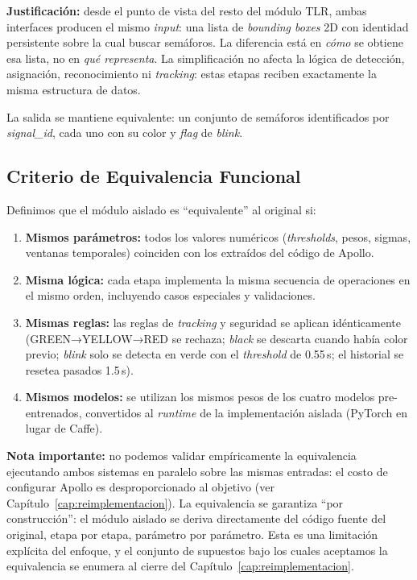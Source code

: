 \textbf{Justificación:} desde el punto de vista del resto del módulo TLR, ambas interfaces producen el mismo \textit{input}: una lista de \textit{bounding boxes} 2D con identidad persistente sobre la cual buscar semáforos. La diferencia está en \textit{cómo} se obtiene esa lista, no en \textit{qué representa}. La simplificación no afecta la lógica de detección, asignación, reconocimiento ni \textit{tracking}: estas etapas reciben exactamente la misma estructura de datos.

La salida se mantiene equivalente: un conjunto de semáforos identificados por \textit{signal\_id}, cada uno con su color y \textit{flag} de \textit{blink}.

\subsection{Criterio de Equivalencia Funcional}

Definimos que el módulo aislado es ``equivalente'' al original si:

\begin{enumerate}
    \item \textbf{Mismos parámetros:} todos los valores numéricos (\textit{thresholds}, pesos, sigmas, ventanas temporales) coinciden con los extraídos del código de Apollo.
    \item \textbf{Misma lógica:} cada etapa implementa la misma secuencia de operaciones en el mismo orden, incluyendo casos especiales y validaciones.
    \item \textbf{Mismas reglas:} las reglas de \textit{tracking} y seguridad se aplican idénticamente (GREEN→YELLOW→RED se rechaza; \textit{black} se descarta cuando había color previo; \textit{blink} solo se detecta en verde con el \textit{threshold} de 0.55\,s; el historial se resetea pasados 1.5\,s).
    \item \textbf{Mismos modelos:} se utilizan los mismos pesos de los cuatro modelos pre-entrenados, convertidos al \textit{runtime} de la implementación aislada (PyTorch en lugar de Caffe).
\end{enumerate}

\textbf{Nota importante:} no podemos validar empíricamente la equivalencia ejecutando ambos sistemas en paralelo sobre las mismas entradas: el costo de configurar Apollo es desproporcionado al objetivo (ver Capítulo~\ref{cap:reimplementacion}). La equivalencia se garantiza ``por construcción'': el módulo aislado se deriva directamente del código fuente del original, etapa por etapa, parámetro por parámetro. Esta es una limitación explícita del enfoque, y el conjunto de supuestos bajo los cuales aceptamos la equivalencia se enumera al cierre del Capítulo~\ref{cap:reimplementacion}.

